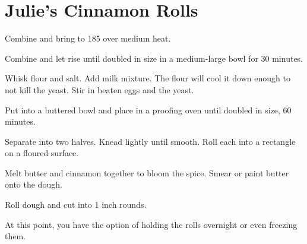 \section{Julie's Cinnamon Rolls}
\begin{recipe}



Combine and bring to 185\degree{} over medium heat.


Combine and let rise until doubled in size in a medium-large bowl for 30 minutes.


Whisk flour and salt. Add milk mixture. The flour will cool it down enough 
to not kill the yeast. Stir in beaten eggs and the yeast. 

Put into a buttered bowl and place in a proofing oven until doubled in size, 
60 minutes. 

Separate into two halves. Knead lightly until smooth. 
Roll each into a rectangle on a floured surface. 


Melt butter and cinnamon together to bloom the spice. 
Smear or paint butter onto the dough.

Roll dough and cut into 1 inch rounds. 

At this point, you have the option of holding the rolls overnight or even freezing them.


\end{recipe}
